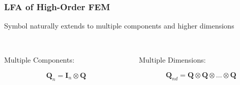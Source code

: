 \documentclass{beamer}
\begin{document}
\begin{frame}
\begin{center}
\frametitle{LFA of High-Order FEM}

Symbol naturally extends to multiple components and higher dimensions\\

~\\

\begin{columns}[onlytextwidth]
  \begin{column}{0.45\textwidth}
    \begin{center}
    Multiple Components:
    \end{center}
    \begin{equation}
    \mathbf{Q}_n = \mathbf{I}_n \otimes \mathbf{Q}
    \end{equation}
  \end{column}

  \begin{column}{0.45\textwidth}
    \begin{center}
    Multiple Dimensions:
    \end{center}
    \begin{equation}
    \mathbf{Q}_{nd} = \mathbf{Q} \otimes \mathbf{Q} \otimes \dots \otimes \mathbf{Q}
    \end{equation}
  \end{column}
\end{columns}

\end{center}
\end{frame}

\end{document}
